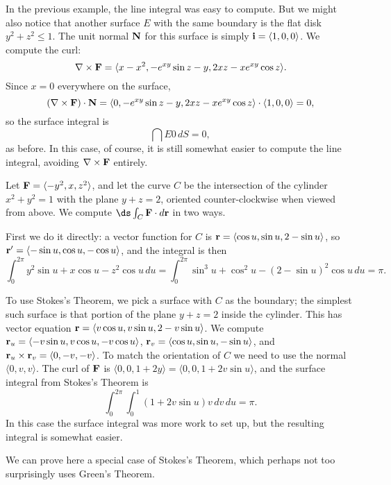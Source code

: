 \begin{example} In the previous example, the line integral was easy to
compute. But we might also notice that another surface $E$ with the
same boundary is the flat disk $y^2+z^2\le 1$. The unit normal $\bf N$
for this surface is simply ${\bf i}=\langle 1,0,0\rangle$. We compute
the curl:
$$\nabla\times{\bf F}=\langle x-x^2,-e^{xy}\sin z-y,2xz-xe^{xy}\cos
z\rangle.$$ 
Since $x=0$ everywhere on the surface,
$$(\nabla\times{\bf F})\cdot {\bf N}=
\langle 0,-e^{xy}\sin z-y,2xz-xe^{xy}\cos
z\rangle\cdot\langle 1,0,0\rangle=0,$$
so the surface integral is
$$\dint{E}0\,dS=0,$$
as before. In this case, of course, it is still somewhat easier to
compute the line integral, avoiding $\nabla\times{\bf F}$ entirely.
\end{example}

\begin{example} Let ${\bf F}=\langle -y^2,x,z^2\rangle$, and let the curve $C$
be the intersection of the cylinder $x^2+y^2=1$ with the plane
$y+z=2$, oriented counter-clockwise when viewed from above.
We compute $\ds\int_C {\bf F}\cdot d{\bf r}$ in two ways.

First we do it directly: a vector function for $C$ is
${\bf r}=\langle \cos u,\sin u, 2-\sin u\rangle$, so
${\bf r}'=\langle -\sin u,\cos u,-\cos u\rangle$, and the integral is then
$$\int_0^{2\pi} y^2\sin u+x\cos u-z^2\cos u\,du
=\int_0^{2\pi} \sin^3 u+\cos^2 u-(2-\sin u)^2\cos u\,du
=\pi.$$

To use Stokes's Theorem, we pick a surface with $C$ as the boundary;
the simplest such surface is that portion of the plane $y+z=2$ inside
the cylinder. This has vector equation ${\bf r}=\langle
v\cos u,v\sin u,2-v\sin u\rangle$. We compute
${\bf r}_u= \langle -v\sin u,v\cos u,-v\cos u\rangle$,
${\bf r}_v= \langle \cos u,\sin u, -\sin u\rangle$, and 
${\bf r}_u\times{\bf r}_v=\langle 0,-v,-v\rangle$. To match the
orientation of $C$ we need to use the normal $\langle
0,v,v\rangle$. The curl of $\bf F$ is $\langle 0,0,1+2y\rangle=
\langle 0,0,1+2v\sin u\rangle$, and
the surface integral from Stokes's Theorem is
$$\int_0^{2\pi}\int_0^1 (1+2v\sin u)v\,dv\,du=\pi.$$
In this case the surface integral was more work to set up, but the
resulting integral is somewhat easier.
\end{example}

\vskip6pt\kern1pc\bgroup

We can prove here a special case of Stokes's Theorem, which perhaps
not too surprisingly uses Green's Theorem.

